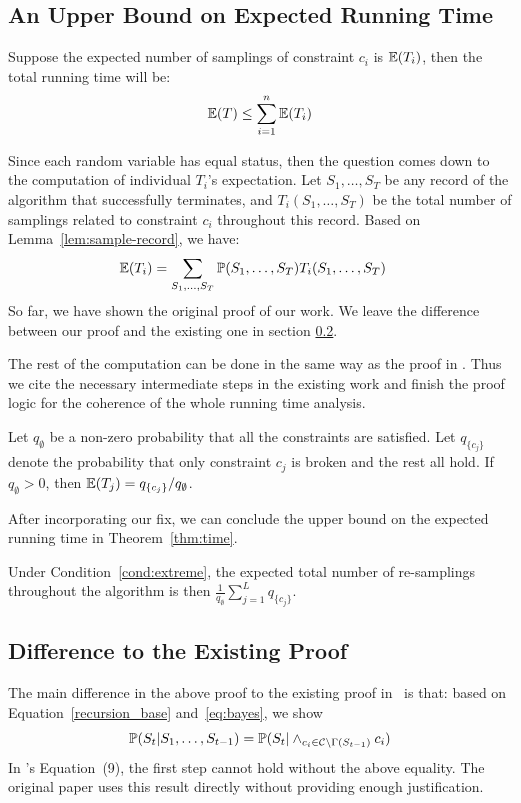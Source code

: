 \subsection{An Upper Bound on Expected Running Time}
Suppose the expected number of samplings of constraint $c_i$ is $\mathbb{E}(T_i)$,
then the total running time will be:
\begin{equation*}
    \mathbb{E}(T) \le \sum_{i=1}^n \mathbb{E} (T_i)
\end{equation*}

Since each random variable has equal status, then the question comes down to
the computation of individual $T_i$'s expectation. Let $S_1,\ldots,S_T$ be any
record of the algorithm that successfully terminates, and $T_i(S_1,\ldots,S_T)$
be the total number of samplings related to constraint $c_i$ throughout this
record. Based on Lemma~\ref{lem:sample-record}, we have:
\begin{align*} \label{ti_formula}
    \mathbb{E}(T_i) & = \sum_{S_1,\ldots,S_T} \mathbb{P}(S_1,\ldots,S_T)T_i(S_1,\ldots,S_T)
\end{align*}
{So far, we have shown the original proof of our work. We leave the difference between our proof and the existing one in section \ref{apx:difference}.}

The rest of the computation can be done in the same way as the proof in
\citep{DBLP:journals/jacm/GuoJL19}. Thus we cite the necessary intermediate
steps in the existing work and finish the proof logic for the coherence of the
whole running time analysis.
\begin{lemma*} \label{thm:runtime} Let $q_{\emptyset}$ be a non-zero probability that all the constraints are satisfied. Let $q_{\{c_j\}}$ denote the probability that only constraint $c_j$ is broken and the rest all hold. If $q_\emptyset>0$, then
    $\mathbb{E}(T_j) ={q_{\{c_j\}}}/{q_\emptyset}$.
\end{lemma*}

After incorporating our fix, we can conclude the upper bound on the expected
running time in Theorem~\ref{thm:time}.
\begin{theorem} \label{thm:time} Under Condition~\ref{cond:extreme},
    the expected total number of re-samplings throughout the algorithm is then $\frac{1}{q_{\emptyset}}\sum_{j=1}^L q_{\{c_j\}}$.
\end{theorem}

\subsection{Difference to the Existing Proof}  \label{apx:difference}
The main difference in the above proof to the existing proof in~\citep[Theorem
    13]{DBLP:journals/jacm/GuoJL19} is that: based on
Equation~\eqref{recursion_base} and~\eqref{eq:bayes}, we show
\begin{equation*}
    \mathbb{P}(S_t | S_1, \ldots, S_{t-1})=\mathbb{P}(S_t |\wedge_{c_i \in \mathcal{C}\backslash \Gamma(S_{t-1})}c_i)
\end{equation*}
In \citep{DBLP:journals/jacm/GuoJL19}'s Equation~(9), the first step cannot hold without the above equality. The original paper uses this result directly without providing enough justification.
